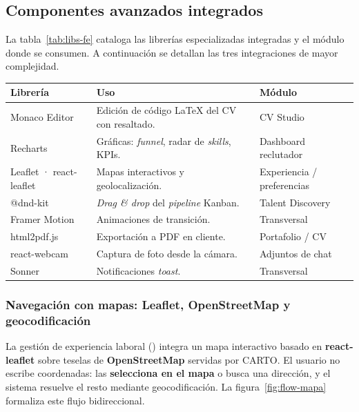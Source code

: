\subsection{Componentes avanzados integrados}
\label{subsec:comp_avanzados}

La tabla~\ref{tab:libs-fe} cataloga las librerías especializadas integradas y el módulo
donde se consumen. A continuación se detallan las tres integraciones de mayor complejidad.

\vspace{0.2cm}
\noindent
\renewcommand{\arraystretch}{1.3}
\fontsize{8.5}{10.2}\selectfont\sffamily
\begin{tabularx}{\textwidth}{|L{3.0cm}|Y|L{3.2cm}|}
\hline
{}
\sffamily\textbf{Librería} & \sffamily\textbf{Uso} & \sffamily\textbf{Módulo} \\
\hline
Monaco Editor & Edición de código LaTeX del CV con resaltado. & CV Studio \\
\hline
{}
Recharts & Gráficas: \textit{funnel}, radar de \textit{skills}, KPIs. & Dashboard reclutador \\
\hline
Leaflet · react-leaflet & Mapas interactivos y geolocalización. & Experiencia / preferencias \\
\hline
{}
@dnd-kit & \textit{Drag \& drop} del \textit{pipeline} Kanban. & Talent Discovery \\
\hline
Framer Motion & Animaciones de transición. & Transversal \\
\hline
{}
html2pdf.js & Exportación a PDF en cliente. & Portafolio / CV \\
\hline
react-webcam & Captura de foto desde la cámara. & Adjuntos de chat \\
\hline
{}
Sonner & Notificaciones \textit{toast}. & Transversal \\
\hline
\end{tabularx}
\label{tab:libs-fe}

\subsubsection{Navegación con mapas: Leaflet, OpenStreetMap y geocodificación}
\label{subsubsec:mapas}

La gestión de experiencia laboral () integra un mapa
interactivo basado en \textbf{react-leaflet} sobre teselas de \textbf{OpenStreetMap}
servidas por CARTO. El usuario no escribe coordenadas: las \textbf{selecciona en el mapa}
o busca una dirección, y el sistema resuelve el resto mediante geocodificación. La
figura~\ref{fig:flow-mapa} formaliza este flujo bidireccional.

